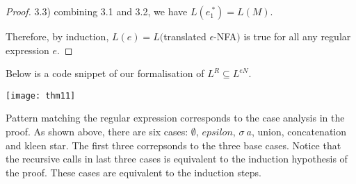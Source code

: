\begin{proof}
\par 3.3) combining 3.1 and 3.2, we have \(L(e_1^{\ *}) = L(M)\). 

\par \noindent Therefore, by induction, \(L(e) = L(\)translated
\(\epsilon\)-NFA\()\) is true for all any regular expression \(e\). 
\end{proof}

\newpage 
\par Below is a code snippet of our formalisation of \(L^R \subseteq
L^{eN}\). 

\begin{center} \texttt{[image: thm11]} \end{center}

\par Pattern matching the regular expression corresponds to the case
analysis in the proof. As shown above, there are six cases:
\(\emptyset\), \(epsilon\), \(\sigma\ a\), union, concatenation and
kleen star. The first three correpsonds to the three base
cases. Notice that the recursive calls in last three cases is equivalent to the induction hypothesis of the
proof. These cases are equivalent to the induction steps. 